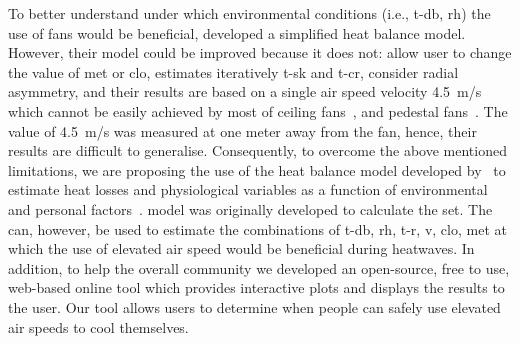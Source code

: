 To better understand under which environmental conditions (i.e., \ac{t-db}, \ac{rh}) the use of fans would be beneficial,  developed a simplified heat balance model.
However, their model could be improved because it does not: allow user to change the value of \ac{met} or \ac{clo}, estimates iteratively \ac{t-sk} and \ac{t-cr}, consider radial asymmetry, and their results are based on a single air speed velocity 4.5~m/s which cannot be easily achieved by most of ceiling fans~\cite{Raftery2019}, and pedestal fans~\cite{Yang2015a}.
The value of 4.5~m/s was measured at one meter away from the fan, hence, their results are difficult to generalise.
Consequently, to overcome the above mentioned limitations, we are proposing the use of the heat balance model developed by~ to estimate heat losses and physiological variables as a function of environmental and personal factors~\cite{Gagge1986}.
 model was originally developed to calculate the \ac{set}.
The  can, however, be used to estimate the combinations of \ac{t-db}, \ac{rh}, \ac{t-r}, \ac{v}, \ac{clo}, \ac{met} at which the use of elevated air speed would be beneficial during heatwaves.
In addition, to help the overall community we developed an open-source, free to use, web-based online tool which provides interactive plots and displays the results to the user.
Our tool allows users to determine when people can safely use elevated air speeds to cool themselves.